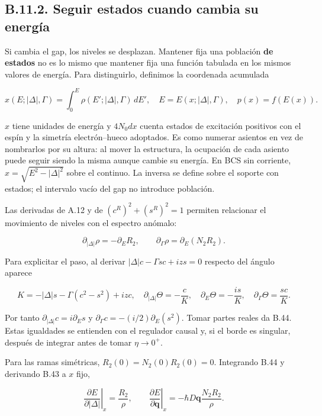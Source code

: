 \documentclass[
  spanish,
  10pt,
  a4paper,
]{article}
\begin{document}
\subsection{B.11.2. Seguir estados cuando cambia su
energía}\label{b.11.2.-seguir-estados-cuando-cambia-su-energuxeda}

Si cambia el gap, los niveles se desplazan. Mantener fija una población
\textbf{de estados} no es lo mismo que mantener fija una función
tabulada en los mismos valores de energía. Para distinguirlo, definimos
la coordenada acumulada

\[
x(E;|\Delta|,\Gamma)=\int_0^E\rho(E';|\Delta|,\Gamma)\,dE',
\quad E=E(x;|\Delta|,\Gamma),\quad p(x)=f(E(x)).
\tag{B.43}
\]

\(x\) tiene unidades de energía y \(4N_0dx\) cuenta estados de
excitación positivos con el espín y la simetría electrón--hueco
adoptados. Es como numerar asientos en vez de nombrarlos por su altura:
al mover la estructura, la ocupación de cada asiento puede seguir siendo
la misma aunque cambie su energía. En BCS sin corriente,
\(x=\sqrt{E^2-|\Delta|^2}\) sobre el continuo. La inversa se define
sobre el soporte con estados; el intervalo vacío del gap no introduce
población.

Las derivadas de A.12 y de \((c^R)^2+(s^R)^2=1\) permiten relacionar el
movimiento de niveles con el espectro anómalo:

\[
\partial_{|\Delta|}\rho=-\partial_E R_2,
\qquad \partial_\Gamma\rho=\partial_E(N_2R_2).
\tag{B.44}
\]

Para explicitar el paso, al derivar \(|\Delta|c-\Gamma sc+izs=0\)
respecto del ángulo aparece

\[
K=-|\Delta|s-\Gamma(c^2-s^2)+izc,
\quad \partial_{|\Delta|}\Theta=-\frac{c}{K},
\quad \partial_E\Theta=-\frac{is}{K},
\quad \partial_\Gamma\Theta=\frac{sc}{K}.
\tag{B.44a}
\]

Por tanto \(\partial_{|\Delta|}c=i\partial_Es\) y
\(\partial_\Gamma c=-(i/2)\partial_E(s^2)\). Tomar partes reales da
B.44. Estas igualdades se entienden con el regulador causal y, si el
borde es singular, después de integrar antes de tomar \(\eta\to0^+\).

Para las ramas simétricas, \(R_2(0)=N_2(0)R_2(0)=0\). Integrando B.44 y
derivando B.43 a \(x\) fijo,

\[
\left.\frac{\partial E}{\partial|\Delta|}\right|_x=\frac{R_2}{\rho},
\qquad
\left.\frac{\partial E}{\partial\mathbf q}\right|_x
=-\hbar D\mathbf q\frac{N_2R_2}{\rho}.
\tag{B.45}
\]
\end{document}
